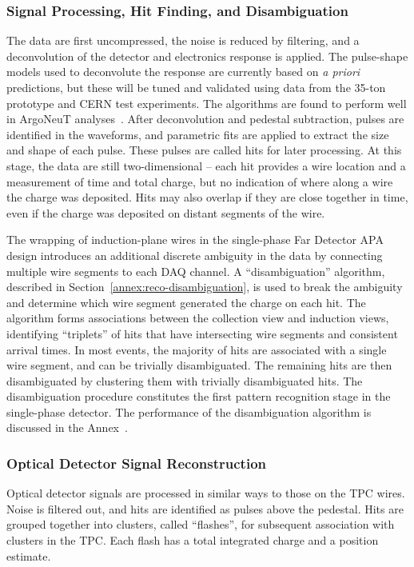 \subsubsection{Signal Processing, Hit Finding, and Disambiguation}

The data are first uncompressed, the noise is reduced by filtering,
and a deconvolution of the detector and electronics response is applied.
The pulse-shape models used to deconvolute the response are currently
based on {\it a priori} predictions, but these will be tuned and
validated using data from the 35-ton prototype and CERN test experiments.
The algorithms are found to perform well in ArgoNeuT analyses~\cite{Anderson:2012vc}.
After deconvolution and pedestal subtraction, pulses are identified in
the waveforms, and parametric fits are applied to extract the size and
shape of each pulse. These pulses are called hits for later processing.
At this stage, the data are still two-dimensional -- each hit provides
a wire location and a measurement of time and total charge,
but no indication of where along a wire the charge was deposited.
Hits may also overlap if they are close together in time, 
even if the charge was deposited on distant segments of the wire.

The wrapping of induction-plane wires in the single-phase Far Detector APA design
introduces an additional discrete ambiguity in the data by connecting multiple wire
segments to each DAQ channel. A ``disambiguation'' algorithm,
described in Section~\ref{annex:reco-disambiguation}, is used to break the
ambiguity and determine which wire segment generated the charge on each hit.
The algorithm forms associations between the collection view and induction views,
identifying ``triplets'' of hits that have intersecting wire segments
and consistent arrival times. In most events, the majority of hits are
associated with a single wire segment, and can be trivially disambiguated.
The remaining hits are then disambiguated by clustering them with trivially disambiguated hits.
The disambiguation procedure constitutes the first pattern recognition stage 
in the single-phase detector.  The performance of the disambiguation algorithm is
discussed in the Annex~\cite{annex:disambiguation}.

\subsubsection{Optical Detector Signal Reconstruction}

Optical detector signals are processed in similar ways to those on the TPC wires.
Noise is filtered out, and hits are identified as pulses above the pedestal.
Hits are grouped together into clusters, called ``flashes'', for subsequent
association with clusters in the TPC.  Each flash has a total integrated charge and a position
estimate.


